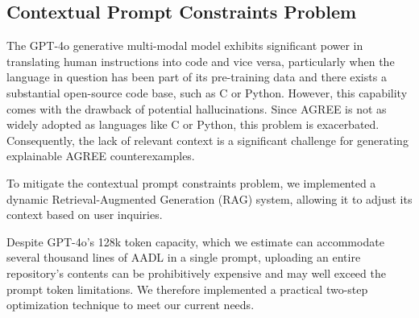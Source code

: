 
\subsection{Contextual Prompt Constraints Problem}

The GPT-4o generative multi-modal model exhibits significant power in translating human instructions into code and vice versa, particularly when the language in question has been part of its pre-training data and there exists a substantial open-source code base, such as C or Python. However, this capability comes with the drawback of potential hallucinations. Since AGREE is not as widely adopted as languages like C or Python, this problem is exacerbated. 
Consequently, the lack of relevant context is a significant challenge for generating explainable AGREE counterexamples. 

To mitigate the contextual prompt constraints problem, we implemented a dynamic Retrieval-Augmented Generation (RAG) system, allowing it to adjust its context based on user inquiries.

Despite GPT-4o's 128k token capacity, which we estimate can accommodate several thousand lines of AADL in a single prompt, uploading an entire repository's contents can be prohibitively expensive and may well exceed the prompt token limitations. We therefore implemented a practical two-step optimization technique to meet our current needs.

